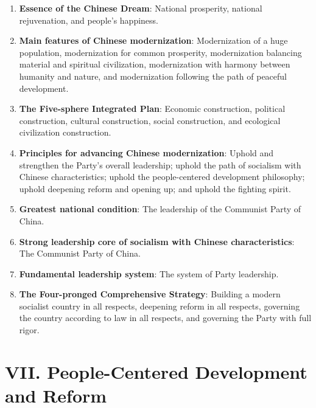 \documentclass[11pt,a4paper]{ctexart}
\begin{document}
\begin{enumerate}[leftmargin=2em]
    \item \textbf{Essence of the Chinese Dream}: National prosperity, national rejuvenation, and people's happiness.
    \item \textbf{Main features of Chinese modernization}: Modernization of a huge population, modernization for common prosperity, modernization balancing material and spiritual civilization, modernization with harmony between humanity and nature, and modernization following the path of peaceful development.
    \item \textbf{The Five-sphere Integrated Plan}: Economic construction, political construction, cultural construction, social construction, and ecological civilization construction.
    \item \textbf{Principles for advancing Chinese modernization}: Uphold and strengthen the Party's overall leadership; uphold the path of socialism with Chinese characteristics; uphold the people-centered development philosophy; uphold deepening reform and opening up; and uphold the fighting spirit.
    \item \textbf{Greatest national condition}: The leadership of the Communist Party of China.
    \item \textbf{Strong leadership core of socialism with Chinese characteristics}: The Communist Party of China.
    \item \textbf{Fundamental leadership system}: The system of Party leadership.
    \item \textbf{The Four-pronged Comprehensive Strategy}: Building a modern socialist country in all respects, deepening reform in all respects, governing the country according to law in all respects, and governing the Party with full rigor.
\end{enumerate}

\section{VII. People-Centered Development and Reform}
\end{document}
